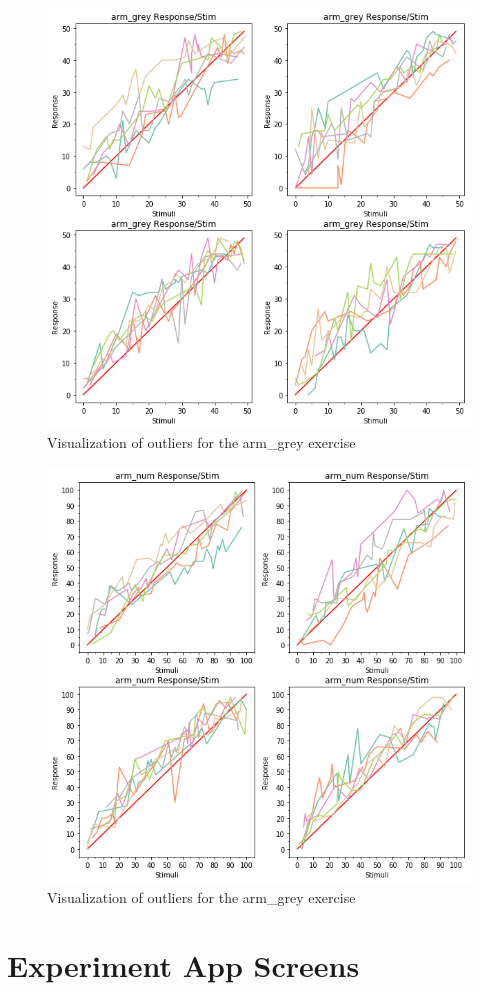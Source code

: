 \begin{figure}[h!]
\centering
\includegraphics[width=1.1\textwidth]{figures/visual_out5.png}
\caption{Visualization of outliers for the arm\_grey exercise}
\label{NAN}
\end{figure}

\begin{figure}[h!]
\centering
\includegraphics[width=1.1\textwidth]{figures/visual_out6.png}
\caption{Visualization of outliers for the arm\_grey exercise}
\label{NAN}
\end{figure}













\chapter{Experiment App Screens}\label{ex_app_screens}
